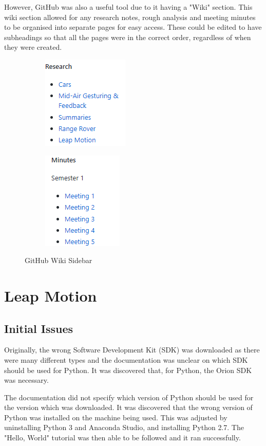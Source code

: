 \documentclass{l4proj}
\begin{document}
However, GitHub was also a useful tool due to it having a "Wiki" section. This wiki section allowed for any research notes, rough analysis and meeting minutes to be organised into separate pages for easy access. These could  be edited to have subheadings so that all the pages were in the correct order, regardless of when they were created. 

\begin{figure}[!htb]
    \centering
    \begin{subfigure}[b]{0.3\textwidth}
        \includegraphics[scale = 0.8]{images/wiki2.png}
    \end{subfigure}
    \begin{subfigure}[b]{0.2\textwidth}
        \includegraphics[scale = 0.8]{images/wiki3.png}
    \end{subfigure}
    \caption{GitHub Wiki Sidebar}
    \label{fig:wiki}
\end{figure}

\section{Leap Motion}
\subsection{Initial Issues}
Originally, the wrong Software Development Kit (SDK) was downloaded as there were many different types and the documentation was unclear on which SDK should be used for Python. It was discovered that, for Python, the Orion SDK was necessary. 

The documentation did not specify which version of Python should be used for the version which was downloaded. It was discovered that the wrong version of Python was installed on the machine being used. This was adjusted by uninstalling Python 3 and Anaconda Studio, and installing Python 2.7. The "Hello, World" tutorial was then able to be followed and it ran successfully. 
\end{document}
